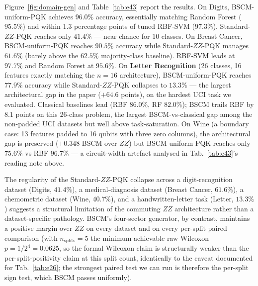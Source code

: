 \documentclass[pdflatex,sn-mathphys]{sn-jnl}
\theoremstyle{plain}
\theoremstyle{remark}
\theoremstyle{definition}
\begin{document}
Figure~\ref{fig:domain-gen} and Table~\ref{tab:e43} report the results. On Digits, BSCM-uniform-PQK achieves $96.0\%$ accuracy, essentially matching Random Forest ($95.5\%$) and within $1.3$ percentage points of tuned RBF-SVM ($97.3\%$). Standard-$ZZ$-PQK reaches only $41.4\%$ --- near chance for 10 classes. On Breast Cancer, BSCM-uniform-PQK reaches $90.5\%$ accuracy while Standard-$ZZ$-PQK manages $61.6\%$ (barely above the $62.5\%$ majority-class baseline). RBF-SVM leads at $97.7\%$ and Random Forest at $95.6\%$.  On \textbf{Letter Recognition} (26 classes, 16 features exactly matching the $n=16$ architecture), BSCM-uniform-PQK reaches $77.9\%$ accuracy while Standard-$ZZ$-PQK collapses to $13.3\%$ --- the largest architectural gap in the paper ($+64.6$ points), on the hardest UCI task we evaluated.  Classical baselines lead (RBF $86.0\%$, RF $82.0\%$); BSCM trails RBF by $8.1$ points on this 26-class problem, the largest BSCM-vs-classical gap among the non-padded UCI datasets but well above task-saturation.  On Wine (a boundary case: 13 features padded to 16 qubits with three zero columns), the architectural gap is preserved ($+0.348$ BSCM over $ZZ$) but BSCM-uniform-PQK reaches only $75.6\%$ vs RBF $96.7\%$ --- a circuit-width artefact analysed in Tab.~\ref{tab:e43}'s reading note above.

The regularity of the Standard-$ZZ$-PQK collapse across a digit-recognition dataset (Digits, $41.4\%$), a medical-diagnosis dataset (Breast Cancer, $61.6\%$), a chemometric dataset (Wine, $40.7\%$), and a handwritten-letter task (Letter, $13.3\%$) suggests a structural limitation of the commuting $ZZ$ architecture rather than a dataset-specific pathology. BSCM's four-sector generator, by contrast, maintains a positive margin over $ZZ$ on every dataset and on every per-split paired comparison (with $n_{\text{splits}}\!=\!5$ the minimum achievable raw Wilcoxon $p = 1/2^4 = 0.0625$, so the formal Wilcoxon claim is structurally weaker than the per-split-positivity claim at this split count, identically to the caveat documented for Tab.~\ref{tab:e26}; the strongest paired test we can run is therefore the per-split sign test, which BSCM passes uniformly).
\end{document}
